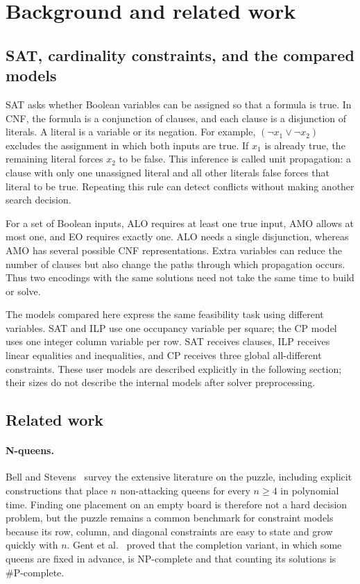 \section{Background and related work}
\subsection{SAT, cardinality constraints, and the compared models}
SAT asks whether Boolean variables can be assigned so that a formula is
true. In CNF, the formula is a conjunction of clauses, and each clause is
a disjunction of literals. A literal is a variable or its negation. For
example, $(\neg x_1\vee\neg x_2)$ excludes the assignment in which both
inputs are true. If $x_1$ is already true, the remaining literal forces
$x_2$ to be false. This inference is called unit propagation: a clause
with only one unassigned literal and all other literals false forces
that literal to be true. Repeating this rule can detect conflicts without
making another search decision.

For a set of Boolean inputs, ALO requires at least one true input, AMO
allows at most one, and EO requires exactly one. ALO needs a single
disjunction, whereas AMO has several possible CNF representations. Extra
variables can reduce the number of clauses but also change the paths
through which propagation occurs. Thus two encodings with the same
solutions need not take the same time to build or solve.

The models compared here express the same feasibility task using different
variables. SAT and ILP use one occupancy variable per square; the CP model
uses one integer column variable per row. SAT receives clauses, ILP receives
linear equalities and inequalities, and CP receives three global
all-different constraints. These user models are described explicitly in
the following section; their sizes do not describe the internal models
after solver preprocessing.

\subsection{Related work}
\paragraph{N-queens.} Bell and Stevens~\cite{bell} survey the extensive
literature on the puzzle, including explicit constructions that place
$n$ non-attacking queens for every $n\ge4$ in polynomial time. Finding one
placement on an empty board is therefore not a hard decision problem,
but the puzzle remains a common benchmark for constraint models because
its row, column, and diagonal constraints are easy to state and grow
quickly with $n$. Gent et al.~\cite{gent} proved that the completion
variant, in which some queens are fixed in advance, is NP-complete and
that counting its solutions is \#P-complete.

